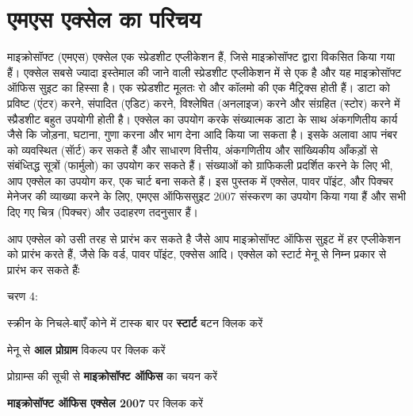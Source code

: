 \chapter{एमएस एक्सेल का परिचय}

माइक्रोसॉफ्ट (एमएस) एक्सेल एक स्प्रेडशीट एप्लीकेशन हैं, जिसे माइक्रोसॉफ्ट द्वारा विकसित किया गया हैं। एक्सेल सबसे ज्यादा इस्तेमाल की जाने वाली स्प्रेडशीट एप्लीकेशन में से एक है और यह माइक्रोसॉफ्ट ऑफिस सुइट का हिस्सा है। एक स्प्रेडशीट मूलतः रो और कॉलमो की एक मैट्रिक्स होती हैं। डाटा को प्रविष्ट (एंटर) करने, संपादित (एडिट) करने, विश्लेषित (अनलाइज) करने और संग्रहित (स्टोर) करने में स्प्रैडशीट बहुत उपयोगी होती है। एक्सेल का उपयोग करके संख्यात्मक डाटा के साथ अंकगणितीय कार्य जैसे कि जोड़ना, घटाना, गुणा करना और भाग देना आदि किया जा सकता है। इसके अलावा आप नंबर को व्यवस्थित (सॅार्ट) कर सकते हैं और साधारण वित्तीय, अंकगणितीय और सांख्यिकीय आँकड़ों से संबंध्तिद्ध सूत्रों (फार्मुलो) का उपयोग कर सकते हैं। संख्याओं को ग्राफिकली प्रदर्शित करने के लिए भी, आप एक्सेल का उपयोग कर, एक चार्ट बना सकते हैं। इस पुस्तक में एक्सेल, पावर पॉइंट, और पिक्चर मेनेजर की व्याख्या करने के लिए, एमएस ऑफिससुइट 2007 संस्करण का उपयोग किया गया हैं और सभी दिए गए चित्र (पिक्चर) और उदाहरण तदनुसार हैं।

आप एक्सेल को उसी तरह से प्रारंभ कर सकते है जैसे आप माइक्रोसॉफ्ट ऑफिस सुइट में हर एप्लीकेशन को प्रारंभ करते हैं, जैसे कि वर्ड, पावर पॉइंट, एक्सेस आदि। एक्सेल को स्टार्ट मेनू से निम्न प्रकार से प्रारंभ कर सकते हैंः

\begin{descriptionSimple}{चरण 4:}
\item[चरण 1] स्क्रीन के निचले-बाएँ कोने में टास्क बार पर \textbf{स्टार्ट} बटन क्लिक करें
\item[चरण 2] मेनू से \textbf{आल प्रोग्राम} विकल्प पर क्लिक करें
\item[चरण 3] प्रोग्राम्स की सूची से \textbf{माइक्रोसॉफ्ट ऑफिस} का चयन करें
\item[चरण 4] \textbf{माइक्रोसॉफ्ट ऑफिस एक्सेल 2007} पर क्लिक करें
\end{descriptionSimple}
\newpage

